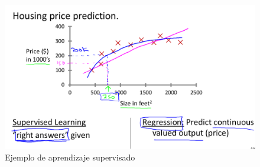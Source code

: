 \documentclass{report}
\begin{document}
\begin{figure}
	\centering
	\includegraphics[scale=0.35]{img/Ej1}
	\caption{Ejemplo de aprendizaje supervisado}
	\label{fig:Ej1}
\end{figure}
\end{document}

